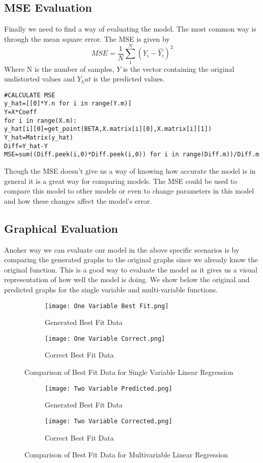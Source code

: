 \subsection{MSE Evaluation}
Finally we need to find a way of evaluating the model. The most common way is through the mean square error.
The MSE is given by 
\begin{equation}
MSE=\frac{1}{N}\sum_{1}^{N}{(Y_i-\hat{Y_i})}^2
\end{equation}
Where N is the number of samples, $Y$ is the vector containing the original undistorted values and $Y_hat$ is the predicted values.
\begin{lstlisting}
#CALCULATE MSE
y_hat=[[0]*Y.n for i in range(Y.m)]
Y=X*Coeff
for i in range(X.m):
y_hat[i][0]=get_point(BETA,X.matrix[i][0],X.matrix[i][1])
Y_hat=Matrix(y_hat)
Diff=Y_hat-Y
MSE=sum((Diff.peek(i,0)*Diff.peek(i,0)) for i in range(Diff.m))/Diff.m
\end{lstlisting}
Though the MSE doesn't give us a way of knowing how accurate the model is in general it is a great way for comparing models. The MSE could be used to compare this model to other models or even to change parameters in this model and how these changes affect the model's error.
\subsection{Graphical Evaluation}
Anoher way we can evaluate our model in the above specific scenarios is by comparing the generated graphs to the original graphs since we already know the original function. This is a good way to evaluate the model as it gives us a visual representation of how well the model is doing. We show below the original and predicted graphs for the single variable and multi-variable functions.
\begin{figure}[h!]
        
    \centering
    \begin{subfigure}{0.5\textwidth}
        \centering
        \texttt{[image: One Variable Best Fit.png]}
        \caption{Generated Best Fit Data}
    \end{subfigure}%
    \begin{subfigure}{0.5\textwidth}
        \centering
        \texttt{[image: One Variable Correct.png]}
        \caption{Correct Best Fit Data}
    \end{subfigure}
    \caption{Comparison of Best Fit Data for Single Variable Linear Regression}
\end{figure}

\begin{figure}[!htb]
    \centering
    \begin{subfigure}{0.5\textwidth}
        \centering
        \texttt{[image: Two Variable Predicted.png]}
        \caption{Generated Best Fit Data}
    \end{subfigure}%
    \begin{subfigure}{0.5\textwidth}
        \centering
        \texttt{[image: Two Variable Corrected.png]}
        \caption{Correct Best Fit Data}
    \end{subfigure}
    \caption{Comparison of Best Fit Data for Multivariable Linear Regression}
\end{figure}